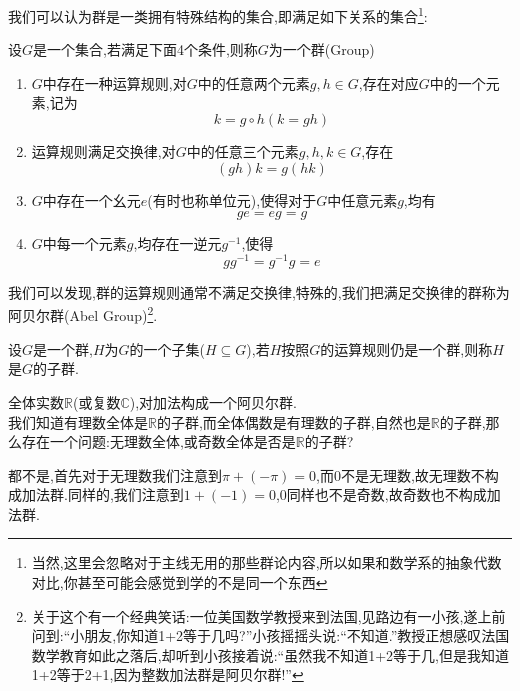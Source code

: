 我们可以认为群是一类拥有特殊结构的集合,即满足如下关系的集合\footnote{当然,这里会忽略对于主线无用的那些群论内容,所以如果和数学系的抽象代数对比,你甚至可能会感觉到学的不是同一个东西}:
\begin{definition}[群的定义]
	设$G$是一个集合,若满足下面4个条件,则称$G$为一个群(Group)
	\begin{enumerate}
		\item $G$中存在一种运算规则,对$G$中的任意两个元素$g,h\in G$,存在对应$G$中的一个元素,记为
		\begin{equation}
			k=g\circ h(k=gh)
		\end{equation}
		\item 运算规则满足交换律,对$G$中的任意三个元素$g,h,k\in G$,存在
		\begin{equation}
			(gh)k=g(hk)
		\end{equation}
		\item $G$中存在一个幺元$e$(有时也称单位元),使得对于$G$中任意元素$g$,均有
		\begin{equation}
			ge=eg=g
		\end{equation}
		\item $G$中每一个元素$g$,均存在一逆元$g^{-1}$,使得
		\begin{equation}
			gg^{-1}=g^{-1}g=e
		\end{equation}
	\end{enumerate}
\end{definition}
我们可以发现,群的运算规则通常不满足交换律,特殊的,我们把满足交换律的群称为阿贝尔群(Abel Group)\footnote{关于这个有一个经典笑话:一位美国数学教授来到法国,见路边有一小孩,遂上前问到:“小朋友,你知道1+2等于几吗?”小孩摇摇头说:“不知道.”教授正想感叹法国数学教育如此之落后,却听到小孩接着说:“虽然我不知道1+2等于几,但是我知道1+2等于2+1,因为整数加法群是阿贝尔群!”}.
\begin{definition}[子群的定义]
	设$G$是一个群,$H$为$G$的一个子集($H\subseteq G$),若$H$按照$G$的运算规则仍是一个群,则称$H$是$G$的子群.
\end{definition}
\begin{example}
	全体实数$\mathbb{R}$(或复数$\mathbb{C}$),对加法构成一个阿贝尔群.\\
	我们知道有理数全体是$\mathbb{R}$的子群,而全体偶数是有理数的子群,自然也是$\mathbb{R}$的子群,那么存在一个问题:无理数全体,或奇数全体是否是$\mathbb{R}$的子群?
\end{example}
\begin{solution}
	都不是,首先对于无理数我们注意到$\pi+(-\pi)=0$,而0不是无理数,故无理数不构成加法群.同样的,我们注意到$1+(-1)=0$,0同样也不是奇数,故奇数也不构成加法群.
\end{solution}
